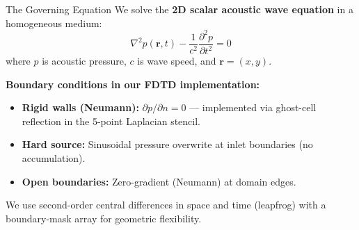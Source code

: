\documentclass[aspectratio=169,11pt]{beamer}
\begin{document}
\begin{frame}{The Governing Equation}
  We solve the \textbf{2D scalar acoustic wave equation} in a homogeneous medium:
  \[
    \nabla^2 p(\mathbf{r},t) - \frac{1}{c^2}\frac{\partial^2 p}{\partial t^2} = 0
  \]
  where $p$ is acoustic pressure, $c$ is wave speed, and $\mathbf{r} = (x,y)$.

  \vspace{0.3cm}
  \textbf{Boundary conditions in our FDTD implementation:}
  \begin{itemize}
    \item \textbf{Rigid walls (Neumann):} $\partial p/\partial n = 0$ — implemented via ghost-cell reflection in the 5-point Laplacian stencil.
    \item \textbf{Hard source:} Sinusoidal pressure overwrite at inlet boundaries (no accumulation).
    \item \textbf{Open boundaries:} Zero-gradient (Neumann) at domain edges.
  \end{itemize}

  \vspace{0.2cm}
  \textcolor{gdpSlate}{\small We use second-order central differences in space and time (leapfrog) with a boundary-mask array for geometric flexibility.}
\end{frame}
\end{document}
